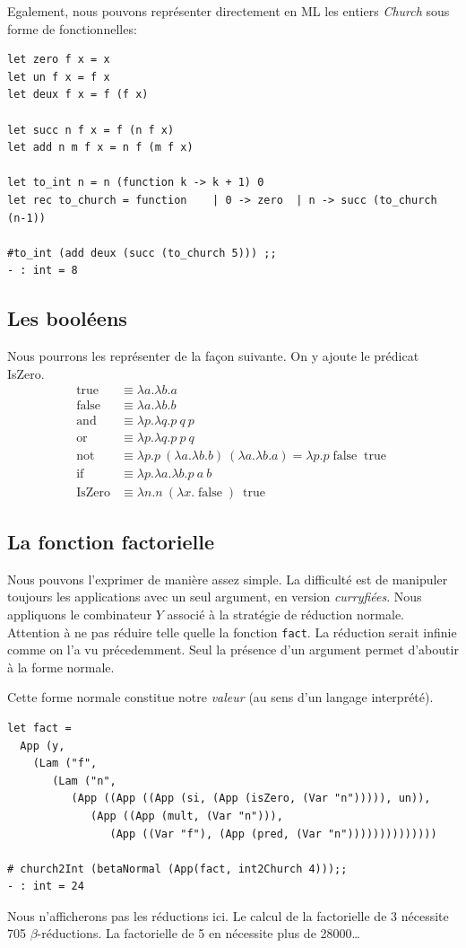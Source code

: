 Egalement, nous pouvons représenter directement en ML les entiers \textit{Church} sous forme de fonctionnelles:
\begin{Verbatim}
let zero f x = x
let un f x = f x
let deux f x = f (f x)

let succ n f x = f (n f x)
let add n m f x = n f (m f x)

let to_int n = n (function k -> k + 1) 0
let rec to_church = function	| 0 -> zero  | n -> succ (to_church (n-1))
	
#to_int (add deux (succ (to_church 5))) ;;
- : int = 8	
\end{Verbatim}

\subsection{Les booléens }
Nous pourrons les représenter de la façon suivante. On y ajoute le prédicat IsZero.
$$
\begin{array}{ll}
\operatorname {true} &\equiv \lambda a.\lambda b.a \\
\operatorname {false} &\equiv \lambda a.\lambda b.b \\
\operatorname {and} &\equiv \lambda p.\lambda q.p\ q\ p\\
\operatorname {or} &\equiv \lambda p.\lambda q.p\ p\ q\\
\operatorname {not} &\equiv \lambda p.p\ (\lambda a.\lambda b.b)\ (\lambda a.\lambda b.a)=\lambda p.p\operatorname {false} \operatorname {true} \\
\operatorname {if} &\equiv \lambda p.\lambda a.\lambda b.p\ a\ b  \\
\operatorname{IsZero} &\equiv  \lambda n.n\ (\lambda x.\operatorname{false})\ \operatorname{true}
\end{array}
$$

\subsection{La fonction factorielle}
Nous pouvons l'exprimer de manière assez simple. La difficulté est de manipuler toujours les applications avec un seul argument, en version
\textit{curryfiées}.
Nous appliquons le combinateur $Y$ associé à la stratégie de réduction normale.
Attention à ne pas réduire telle quelle la fonction \verb+fact+. La réduction serait infinie comme on l'a vu précedemment. Seul la présence
d'un argument permet d'aboutir à la forme normale.

Cette forme normale constitue notre \textit{valeur} (au sens d'un langage interprété).
\begin{Verbatim}
let fact =
  App (y,
    (Lam ("f",
       (Lam ("n",
          (App ((App ((App (si, (App (isZero, (Var "n"))))), un)),
             (App ((App (mult, (Var "n"))),
                (App ((Var "f"), (App (pred, (Var "n"))))))))))))))

# church2Int (betaNormal (App(fact, int2Church 4)));;
- : int = 24																																							 
\end{Verbatim}
Nous n'afficherons pas les réductions ici. Le calcul de la factorielle de 3 nécessite 705 $\beta$-réductions. 
La factorielle de 5 en nécessite plus de 28000\ldots

